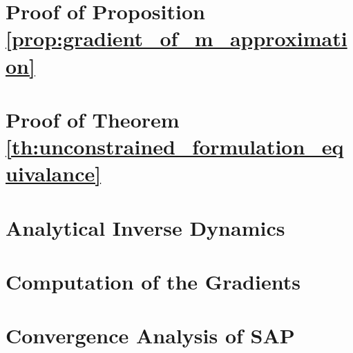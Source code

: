 \section{Proof of Proposition \ref{prop:gradient_of_m_approximation}}
\label{app:gradient_of_m_approximation}


\section{Proof of Theorem \ref{th:unconstrained_formulation_equivalance}}
\label{app:unconstrained_formulation_equivalance}


\section{Analytical Inverse Dynamics}
\label{app:analytical_inverse_dynamics_derivations}


\section{Computation of the Gradients}
\label{app:gradients_derivation}


\section{Convergence Analysis of SAP}
\label{app:sap_converge}


